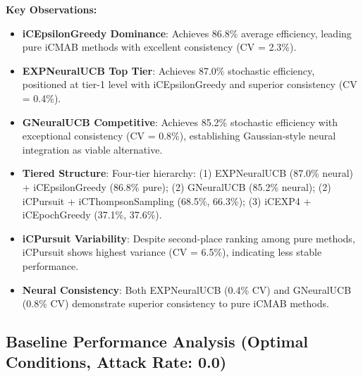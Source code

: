 \documentclass[12pt,a4paper]{article}
\newcommand{\primarytext}[1]{\textcolor{primaryblue}{\textbf{#1}}}
\newcommand{\secondarytext}[1]{\textcolor{secondaryblue}{\textbf{#1}}}
\newcommand{\warning}[1]{\textcolor{warningred}{\textbf{#1}}}
\newcommand{\legacy}[1]{\textcolor{legacycolor}{\textbf{#1}}}
\newcommand{\neural}[1]{\textcolor{neuralcolor}{\textbf{#1}}}
\begin{document}
\begin{tcolorbox}[colback=tableheader,colframe=primaryblue,title=\textbf{Primary iCMAB Performance Results (Stochastic Environment, Attack Rate: 0.25)}]
\textbf{Key Observations:}
\begin{itemize}
\item \primarytext{iCEpsilonGreedy Dominance}: Achieves 86.8\% average efficiency, leading pure iCMAB methods with excellent consistency (CV = 2.3\%).
\item \legacy{EXPNeuralUCB Top Tier}: Achieves 87.0\% stochastic efficiency, positioned at tier-1 level with iCEpsilonGreedy and superior consistency (CV = 0.4\%).
\item \neural{GNeuralUCB Competitive}: Achieves 85.2\% stochastic efficiency with exceptional consistency (CV = 0.8\%), establishing Gaussian-style neural integration as viable alternative.
\item \secondarytext{Tiered Structure}: Four-tier hierarchy: (1) EXPNeuralUCB (87.0\% neural) + iCEpsilonGreedy (86.8\% pure); (2) GNeuralUCB (85.2\% neural); (2) iCPursuit + iCThompsonSampling (68.5\%, 66.3\%); (3) iCEXP4 + iCEpochGreedy (37.1\%, 37.6\%).
\item \warning{iCPursuit Variability}: Despite second-place ranking among pure methods, iCPursuit shows highest variance (CV = 6.5\%), indicating less stable performance.
\item \neural{Neural Consistency}: Both EXPNeuralUCB (0.4\% CV) and GNeuralUCB (0.8\% CV) demonstrate superior consistency to pure iCMAB methods.
\end{itemize}
\end{tcolorbox}

\subsection{Baseline Performance Analysis (Optimal Conditions, Attack Rate: 0.0)}
\end{document}
